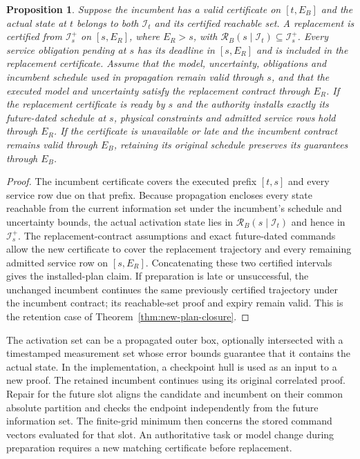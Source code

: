 \documentclass[journal,10pt]{IEEEtran}
\newtheorem{proposition}{Proposition}
\begin{document}
\begin{proposition}
\label{prop:planned-handover}
Suppose the incumbent has a valid certificate on $[t,E_B]$ and the
actual state at $t$ belongs to both $\mathcal I_t$ and its certified
reachable set. A replacement is certified from $\mathcal I_s^+$ on
$[s,E_R]$, where $E_R>s$, with
$\mathcal R_B(s\mid\mathcal I_t)\subseteq\mathcal I_s^+$.
Every service obligation pending at $s$ has its deadline in $[s,E_R]$
and is included in the replacement certificate. Assume that the model,
uncertainty, obligations and incumbent schedule used in propagation
remain valid through $s$, and that the executed model and uncertainty
satisfy the replacement contract through $E_R$.
If the replacement certificate is ready by
$s$ and the authority installs exactly its future-dated schedule at $s$,
physical constraints and admitted service rows hold through $E_R$.
If the certificate is unavailable or late and the incumbent contract
remains valid through $E_B$, retaining its original schedule preserves
its guarantees through $E_B$.
\end{proposition}
\begin{proof}
The incumbent certificate covers the executed prefix $[t,s]$ and every
service row due on that prefix. Because propagation encloses every state reachable from the current
information set under the incumbent's schedule and uncertainty bounds,
the actual activation state lies in
$\mathcal R_B(s\mid\mathcal I_t)$ and hence in $\mathcal I_s^+$. The replacement-contract assumptions and exact
future-dated commands allow the new certificate to cover the replacement
trajectory and every remaining admitted service row on $[s,E_R]$.
Concatenating these two certified intervals gives the installed-plan
claim. If preparation is late or unsuccessful, the unchanged incumbent
continues the same previously certified trajectory under the incumbent
contract; its reachable-set proof and expiry remain valid. This is the retention case of
Theorem~\ref{thm:new-plan-closure}.
\end{proof}

The activation set can be a propagated outer box, optionally intersected
with a timestamped measurement set whose error bounds guarantee that it
contains the actual state. In the implementation, a checkpoint hull
is used as an input to a new proof. The retained incumbent continues
using its original correlated proof. Repair for the future slot aligns
the candidate and incumbent on their common absolute partition and
checks the endpoint independently from the future information set.
The finite-grid minimum then concerns the stored command vectors
evaluated for that slot. An authoritative task or model change during
preparation requires a new matching certificate before replacement.
\end{document}
